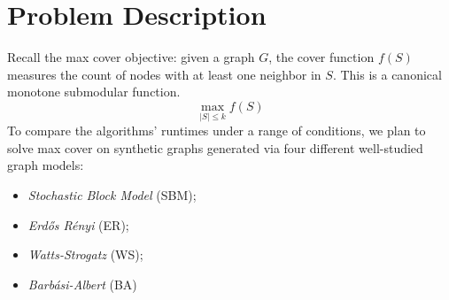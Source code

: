 \documentclass[11pt, a4paper]{article}
\begin{document}
\section{Problem Description} %
Recall the max cover objective: given a graph $G$, the cover function $f(S)$ measures the count of nodes with at least one neighbor in $S$. This is a canonical monotone submodular function. 
\begin{equation}
    \max _{|S| \leq k} f(S)
\end{equation}
To compare the algorithms’ runtimes under a range of conditions, we plan to solve max cover on synthetic graphs generated via four different well-studied graph models:
\begin{itemize}
    \item \emph{Stochastic Block Model} (SBM);
    \item \emph{Erd\H{o}s R\'{e}nyi} (ER);
    \item \emph{Watts-Strogatz} (WS);
    \item \emph{Barb\'{a}si-Albert} (BA)
\end{itemize}
 

\end{document}
